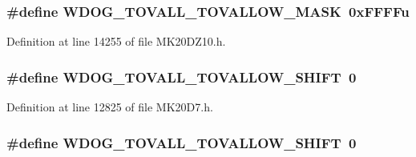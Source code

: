 \subsubsection[{\texorpdfstring{W\+D\+O\+G\+\_\+\+T\+O\+V\+A\+L\+L\+\_\+\+T\+O\+V\+A\+L\+L\+O\+W\+\_\+\+M\+A\+SK}{WDOG_TOVALL_TOVALLOW_MASK}}]{\setlength{\rightskip}{0pt plus 5cm}\#define W\+D\+O\+G\+\_\+\+T\+O\+V\+A\+L\+L\+\_\+\+T\+O\+V\+A\+L\+L\+O\+W\+\_\+\+M\+A\+SK~0x\+F\+F\+F\+Fu}\hypertarget{group___w_d_o_g___register___masks_ga71c3913b6be99b211a3c3031caf8ac66}{}\label{group___w_d_o_g___register___masks_ga71c3913b6be99b211a3c3031caf8ac66}


Definition at line 14255 of file M\+K20\+D\+Z10.\+h.

\subsubsection[{\texorpdfstring{W\+D\+O\+G\+\_\+\+T\+O\+V\+A\+L\+L\+\_\+\+T\+O\+V\+A\+L\+L\+O\+W\+\_\+\+S\+H\+I\+FT}{WDOG_TOVALL_TOVALLOW_SHIFT}}]{\setlength{\rightskip}{0pt plus 5cm}\#define W\+D\+O\+G\+\_\+\+T\+O\+V\+A\+L\+L\+\_\+\+T\+O\+V\+A\+L\+L\+O\+W\+\_\+\+S\+H\+I\+FT~0}\hypertarget{group___w_d_o_g___register___masks_ga57ba2617b2855cd4b3d1eb0b3c878f52}{}\label{group___w_d_o_g___register___masks_ga57ba2617b2855cd4b3d1eb0b3c878f52}


Definition at line 12825 of file M\+K20\+D7.\+h.

\subsubsection[{\texorpdfstring{W\+D\+O\+G\+\_\+\+T\+O\+V\+A\+L\+L\+\_\+\+T\+O\+V\+A\+L\+L\+O\+W\+\_\+\+S\+H\+I\+FT}{WDOG_TOVALL_TOVALLOW_SHIFT}}]{\setlength{\rightskip}{0pt plus 5cm}\#define W\+D\+O\+G\+\_\+\+T\+O\+V\+A\+L\+L\+\_\+\+T\+O\+V\+A\+L\+L\+O\+W\+\_\+\+S\+H\+I\+FT~0}\hypertarget{group___w_d_o_g___register___masks_ga57ba2617b2855cd4b3d1eb0b3c878f52}{}\label{group___w_d_o_g___register___masks_ga57ba2617b2855cd4b3d1eb0b3c878f52}


